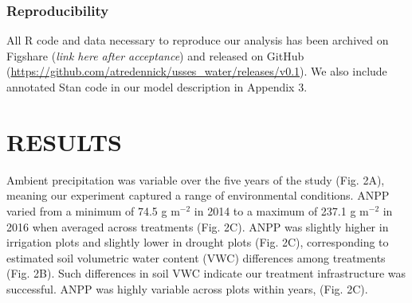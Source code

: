 \documentclass[fleqn,10pt,lineno]{wlpeerj} %
\begin{document}

\hypertarget{reproducibility}{%
\subsubsection{Reproducibility}\label{reproducibility}}

All R code and data necessary to reproduce our analysis has been
archived on Figshare (\emph{link here after acceptance}) and released on
GitHub (\url{https://github.com/atredennick/usses_water/releases/v0.1}).
We also include annotated Stan code in our model description in Appendix
3.

\hypertarget{results}{%
\section{RESULTS}\label{results}}

Ambient precipitation was variable over the five years of the study
(Fig. 2A), meaning our experiment captured a range of environmental
conditions. ANPP varied from a minimum of 74.5 g m\(^{-2}\) in 2014 to a
maximum of 237.1 g m\(^{-2}\) in 2016 when averaged across treatments
(Fig. 2C). ANPP was slightly higher in irrigation plots
 and slightly lower in drought plots
 (Fig. 2C),
corresponding to estimated soil volumetric water content (VWC)
differences among treatments (Fig. 2B).
Such differences in soil VWC indicate our treatment infrastructure was
successful. ANPP was highly variable across plots within years,
(Fig. 2C).
\end{document}
